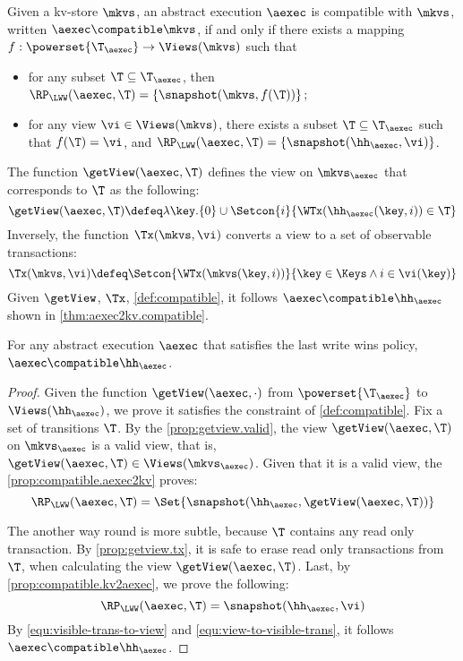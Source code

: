 \begin{definition}
\label{def:compatible}
Given a kv-store $\mkvs$,
an abstract execution $\aexec$ is compatible with $\mkvs$, written 
$\aexec \compatible \mkvs$, if and only if there exists a  mapping 
$f: \powerset{\T_{\aexec}} \rightarrow \Views(\mkvs)$
such that  
\begin{itemize}
\item for any subset $\T \subseteq \T_{\aexec}$, then $\RP_{\LWW}(\aexec, \T) = \{\snapshot(\mkvs, f(\T))\}$; 
\item for any view $\vi \in \Views(\mkvs)$, there exists a subset $\T \subseteq \T_{\aexec}$ 
such that $f(\T) = \vi$, and $\RP_{\LWW}(\aexec, \T) = \{\snapshot(\hh_{\aexec}, \vi)\}$.
\end{itemize}
\end{definition}

The function $\getView(\aexec, \T)$ defines the view on \( \mkvs_\aexec \) that corresponds to \( \T \) as the following:
\[
    \getView(\aexec, \T) \defeq \lambda \key. \{0\} \cup \Setcon{ i }{\WTx(\hh_{\aexec}(\key, i)) \in \T}
\]
Inversely, the function \( \Tx(\mkvs, \vi) \) converts a view to a set of observable transactions:
\[
\Tx(\mkvs, \vi) \defeq \Setcon{ \WTx(\mkvs(\key, i)) }{ \key \in \Keys \wedge i \in \vi(\key) }
\]
Given \( \getView \), \( \Tx \), \cref{def:compatible}, 
it follows \( \aexec \compatible \hh_{\aexec} \) shown in \cref{thm:aexec2kv.compatible}.

\begin{theorem}
\label{thm:aexec2kv.compatible}
For any abstract execution $\aexec$ that satisfies the last write wins policy, $\aexec \compatible \hh_{\aexec}$.
\end{theorem}
\begin{proof}
Given the function $\getView(\aexec, \cdot )$ from $\powerset{\T_{\aexec}}$ to $\Views(\hh_{\aexec})$,
we prove it satisfies the constraint of \cref{def:compatible}.
Fix a set of transitions \( \T \).
By the \cref{prop:getview.valid}, the view $\getView(\aexec, \T )$  on \( \mkvs_\aexec \) is a valid view,
that is, \( \getView(\aexec, \T ) \in \Views(\mkvs_\aexec) \).
Given that it is a valid view, the \cref{prop:compatible.aexec2kv} proves:
\begin{equation}
    \label{equ:visible-trans-to-view}
    \RP_{\LWW}(\aexec, \T) = \Set{\snapshot(\hh_{\aexec}, \getView(\aexec, \T))} 
\end{equation}

The another way round is more subtle,
because \( \T \) contains any read only transaction.
By \cref{prop:getview.tx}, it is safe to erase read only transactions from \( \T \),
when calculating the view \( \getView(\aexec, \T ) \).
Last, by \cref{prop:compatible.kv2aexec}, we prove the following:
\begin{equation}
    \label{equ:view-to-visible-trans}
    \RP_{\LWW}(\aexec, \T) = \snapshot(\hh_{\aexec}, \vi)
\end{equation}
By \cref{equ:visible-trans-to-view} and \cref{equ:view-to-visible-trans},
it follows \( \aexec \compatible \hh_{\aexec} \).
\end{proof}

